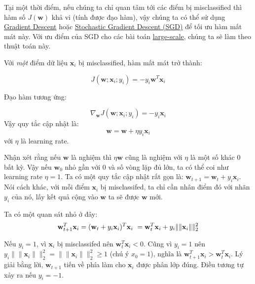 Tại một thời điểm, nếu chúng ta chỉ quan tâm tới các điểm bị misclassified thì hàm số $J(\mathbf{w})$ khả vi (tính được đạo hàm), vậy chúng ta có thể sử dụng \href{http://machinelearningcoban.com/2017/01/12/gradientdescent/}{Gradient Descent} hoặc \href{http://machinelearningcoban.com/2017/01/16/gradientdescent2/#-stochastic-gradient-descent}{Stochastic Gradient Descent (SGD)} để tối ưu hàm mất mát này. Với ưu điểm của SGD cho các bài toán \href{http://machinelearningcoban.com/2017/01/12/gradientdescent/#large-scale}{large-scale}, chúng ta sẽ làm theo thuật toán này.  
 
Với \textit{một} điểm dữ liệu $\mathbf{x}_i$ bị misclassified, hàm mất mát trở thành: 
 
\begin{equation*} 
J(\mathbf{w}; \mathbf{x}_i; y_i) = -y_i\mathbf{w}^T\mathbf{x}_i 
\end{equation*} 
 
Đạo hàm tương ứng: 
 
\begin{equation*} 
\nabla_{\mathbf{w}}J(\mathbf{w}; \mathbf{x}_i; y_i) = -y_i\mathbf{x}_i 
\end{equation*} 
Vậy quy tắc cập nhật là: 
\begin{equation*} 
\mathbf{w} = \mathbf{w} + \eta y_i\mathbf{x}_i 
\end{equation*} 
với $\eta$ là learning rate.  
 
Nhận xét rằng nếu $\mathbf{w}$ là nghiệm thì $\eta\mathbf{w}$ cũng là nghiệm với $\eta$ là một số khác 0 bất kỳ. Vậy nếu $\mathbf{w}_0$ nhỏ gần với 0 và số vòng lặp đủ lớn, ta có thể coi như learning rate $\eta = 1$. Ta có một quy tắc cập nhật rất gọn là: $\mathbf{w}_{t+1} = \mathbf{w}_{t} + y_i\mathbf{x}_i$. Nói cách khác, với mỗi điểm $\mathbf{x}_i$ bị misclassifed, ta chỉ cần nhân điểm đó với nhãn $y_i$ của nó, lấy kết quả cộng vào $\mathbf{w}$ ta sẽ được $\mathbf{w}$ mới. 
 
Ta có một quan sát nhỏ ở đây: 
\begin{equation*} 
\mathbf{w}_{t+1}^T\mathbf{x}_i = (\mathbf{w}_{t} + y_i\mathbf{x}_i)^T\mathbf{x}_{i} \\\ 
= \mathbf{w}_{t}^T\mathbf{x}_i + y_i \|\|\mathbf{x}_i\|\|_2^2 
\end{equation*} 
 
Nếu $y_i = 1$, vì $\mathbf{x}_i$ bị misclassifed nên $\mathbf{w}_{t}^T\mathbf{x}_i < 0$. Cũng vì $y_i = 1$ nên $y_i \|\|\mathbf{x}_i\|\|_2^2 = \|\|\mathbf{x}_i\|\|_2^2 \geq 1$ (chú ý $x_0 = 1$), nghĩa là $\mathbf{w}_{t+1}^T\mathbf{x}_i > \mathbf{w}_{t}^T\mathbf{x}_i$. Lý giải bằng lời, $\mathbf{w}_{t+1}$ tiến về phía làm cho $\mathbf{x}_i$ được phân lớp đúng. Điều tương tự xảy ra nếu $y_i = -1$. 
 
